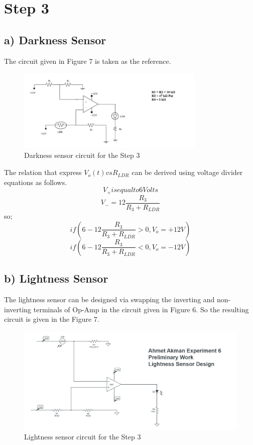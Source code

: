 \documentclass[letterpaper,12pt]{article}
\begin{document}
\section{Step 3}
\subsection{a) Darkness Sensor}
The circuit given in Figure 7 is taken as the reference.
\begin{figure}[H]
	\centering
   \includegraphics[width=0.8\textwidth]{darkness.png}
   \caption{Darkness sensor circuit for the Step 3}
\end{figure} 
The relation that express \(V_o(t) vs R_{LDR}\) can be derived using voltage divider equations as follows.
\[V_+ is equal to 6 Volts
\]\[
V_- = 12\frac{R_3}{R_3+R_{LDR}}
\]
so;
\[ 
if (6-12\frac{R_3}{R_3+R_{LDR}} > 0, V_o = +12V)
\]\[ 
if (6-12\frac{R_3}{R_3+R_{LDR}} < 0, V_o = -12V)
\]
\subsection{b) Lightness Sensor}
The lightness sensor can be designed via swapping the inverting and non-inverting terminals of Op-Amp  in the circuit given in Figure 6. So the resulting circuit is given in the Figure 7.
\begin{figure}[H]
	\centering
   \includegraphics[width=1\textwidth]{lightness.png}
   \caption{Lightness sensor circuit for the Step 3}
\end{figure} 
\end{document}
